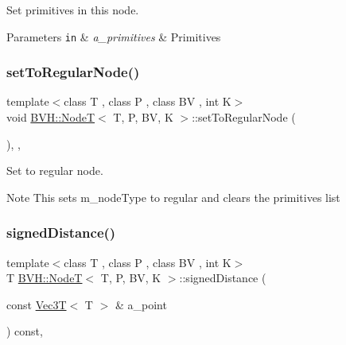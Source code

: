 Set primitives in this node. 


\begin{DoxyParams}[1]{Parameters}
\mbox{\tt in}  & {\em a\+\_\+primitives} & Primitives \\
\hline
\end{DoxyParams}
\mbox{\label{classBVH_1_1NodeT_a8f9c409918d61b0d0ad3dd6e2b692443}} 
\subsubsection{\texorpdfstring{set\+To\+Regular\+Node()}{setToRegularNode()}}
{\footnotesize\ttfamily template$<$class T , class P , class BV , int K$>$ \\
void \hyperlink{classBVH_1_1NodeT}{B\+V\+H\+::\+NodeT}$<$ T, P, BV, K $>$\+::set\+To\+Regular\+Node (\begin{DoxyParamCaption}{ }\end{DoxyParamCaption})\hspace{0.3cm}{\ttfamily [inline]}, {\ttfamily [protected]}, {\ttfamily [noexcept]}}



Set to regular node. 

\begin{DoxyNote}{Note}
This sets m\+\_\+node\+Type to regular and clears the primitives list 
\end{DoxyNote}
\mbox{\label{classBVH_1_1NodeT_a0fe074fbff56ac2d0a6ad113ed34d56b}} 
\subsubsection{\texorpdfstring{signed\+Distance()}{signedDistance()}}
{\footnotesize\ttfamily template$<$class T , class P , class BV , int K$>$ \\
T \hyperlink{classBVH_1_1NodeT}{B\+V\+H\+::\+NodeT}$<$ T, P, BV, K $>$\+::signed\+Distance (\begin{DoxyParamCaption}\item[{const \hyperlink{classVec3T}{Vec3T}$<$ T $>$ \&}]{a\+\_\+point }\end{DoxyParamCaption}) const\hspace{0.3cm}{\ttfamily [inline]}, {\ttfamily [noexcept]}}



